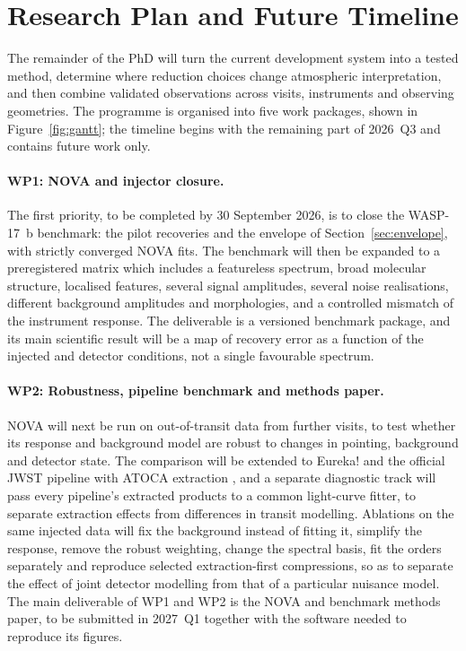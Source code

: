 \section{Research Plan and Future Timeline}
\label{sec:research-plan}

The remainder of the PhD will turn the current development system into a
tested method, determine where reduction choices change atmospheric
interpretation, and then combine validated observations across visits,
instruments and observing geometries. The programme is organised into five
work packages, shown in Figure~\ref{fig:gantt}; the timeline begins with the
remaining part of 2026~Q3 and contains future work only.

\paragraph{WP1: NOVA and injector closure.}
The first priority, to be completed by 30 September 2026, is to close the
WASP-17~b benchmark: the pilot recoveries and the envelope of
Section~\ref{sec:envelope}, with strictly converged NOVA fits. The benchmark will then be expanded to a
preregistered matrix which includes a featureless spectrum, broad molecular
structure, localised features, several signal amplitudes, several noise
realisations, different background amplitudes and morphologies, and a
controlled mismatch of the instrument response. The
deliverable is a versioned benchmark package, and its main scientific result
will be a map of recovery error as a function of the injected and detector
conditions, not a single favourable spectrum.

\paragraph{WP2: Robustness, pipeline benchmark and methods paper.}
NOVA will next be run on out-of-transit data from further visits, to test
whether its response and background model are robust to changes in pointing,
background and detector state. The comparison will be extended to Eureka! and
the official JWST pipeline with ATOCA extraction \citep{DarveauBernierEtAl2022},
and a separate diagnostic track will pass every pipeline's extracted products
to a common light-curve fitter, to separate extraction effects from
differences in transit modelling. Ablations on the same injected data will
fix the background instead of fitting it, simplify the response, remove the
robust weighting, change the spectral basis, fit the orders separately and
reproduce selected extraction-first compressions, so as to separate the
effect of joint detector modelling from that of a particular nuisance
model. The main deliverable of WP1 and WP2 is the NOVA and
benchmark methods paper, to be submitted in 2027~Q1 together with the
software needed to reproduce its figures.

